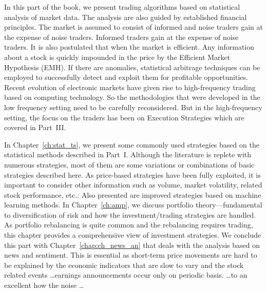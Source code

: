 
In this part of the book, we present trading algorithms based on statistical analysis of market data. The analysis are also guided by established financial principles. The market is assumed to consist of informed and noise traders gain at the expense of noise traders. Informed traders gain at the expense of noise traders. It is also postulated that when the market is efficient. Any information about a stock is quickly impounded in the price by the Efficient Market Hypothesis (EMH). If there are anomalies, statistical arbitrage techniques can be employed to successfully detect and exploit them for profitable opportunities. Recent evolution of electronic markets have given rise to high-frequency trading based on computing technology. So the methodologies that were developed in the low frequency setting need to be carefully reconsidered. But in the high-frequency setting, the focus on the traders has been on Execution Strategies which are covered in Part~III.


In Chapter~\ref{ch:stat_ts}, we present some commonly used strategies based on the statistical methods described in Part~I. Although the literature is replete with numerous strategies, most of them are some variations or combinations of basic strategies described here. As price-based strategies have been fully exploited, it is important to consider other information such as volume, market volatility, related stock performance, etc.. Also presented are improved strategies based on machine learning methods. In Chapter~\ref{ch:amp}, we discuss portfolio theory---fundamental to diversification of risk and how the investment/trading strategies are handled. As portfolio rebalancing is quite common and the rebalancing requires trading, this chapter provides a comprehensive view of investment strategies. We conclude this part with Chapter~\ref{chap:ch_news_an} that deals with the analysis based on news and sentiment. This is essential as short-term price movements are hard to be explained by the economic indicators that are slow to vary and the stock related events \dots earnings announcements occur only on periodic basis. \dots to an excellent how the noise \dots


